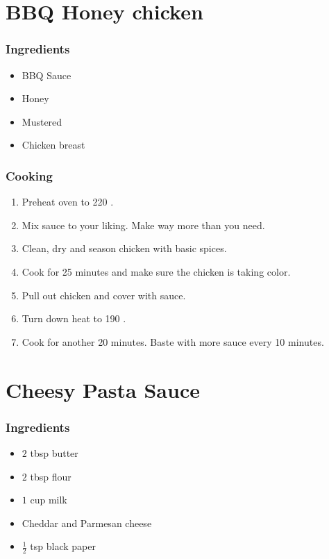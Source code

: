 \section{BBQ Honey chicken}
\subsubsection{Ingredients}
\begin{itemize}
    \item BBQ Sauce
    \item Honey
    \item Mustered
    \item Chicken breast
\end{itemize}

\subsubsection{Cooking}
\begin{enumerate}
    \item Preheat oven to 220 \celsius.
    \item Mix sauce to your liking. Make way more than you need.
    \item Clean, dry and season chicken with basic spices.
    \item Cook for 25 minutes and make sure the chicken is taking color.
    \item Pull out chicken and cover with sauce.
    \item Turn down heat to 190 \celsius.
    \item Cook for another 20 minutes. Baste with more sauce every 10 minutes.
\end{enumerate}

\section{Cheesy Pasta Sauce}
\subsubsection{Ingredients}
\begin{itemize}
    \item $2$ tbsp butter
    \item $2$ tbsp flour
    \item $1$ cup milk
    \item Cheddar and Parmesan cheese
    \item $\frac{1}{2}$ tsp black paper
\end{itemize}

